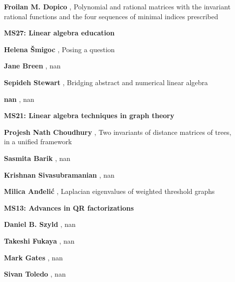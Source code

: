 \documentclass[ILAS2025-program.tex]{subfiles}
\begin{document}
\begin{description}
\begin{description}
        \item[] \textbf{Froilan M. Dopico} , Polynomial and rational matrices with the invariant rational functions and the four sequences of minimal indices prescribed
        \end{description}
    \begin{description}
    \item[] {\color{mstitle}\textbf{MS27: Linear algebra education}} 
    \item[] \textbf{Helena Šmigoc} , Posing a question
        \item[] \textbf{Jane Breen} , nan
        \item[] \textbf{Sepideh Stewart} , Bridging abstract and numerical linear algebra
        \item[] \textbf{nan} , nan
        \end{description}
    \begin{description}
    \item[] {\color{mstitle}\textbf{MS21: Linear algebra techniques in graph theory}} 
    \item[] \textbf{Projesh Nath Choudhury} , Two invariants of distance matrices of trees, in a unified framework
        \item[] \textbf{Sasmita Barik} , nan
        \item[] \textbf{Krishnan Sivasubramanian} , nan
        \item[] \textbf{Milica Anđelić} , Laplacian eigenvalues of weighted threshold graphs
        \end{description}
    \begin{description}
    \item[] {\color{mstitle}\textbf{MS13: Advances in QR factorizations}} 
    \item[] \textbf{Daniel B. Szyld} , nan
        \item[] \textbf{Takeshi Fukaya} , nan
        \item[] \textbf{Mark Gates} , nan
        \item[] \textbf{Sivan Toledo} , nan
        \end{description}

\end{description}
\end{document}
